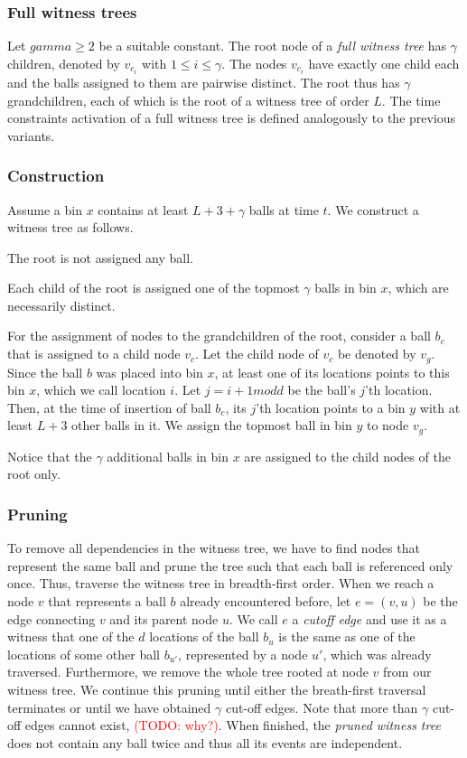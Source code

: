 \documentclass[a4paper,12pt]{article}
\newcommand\todo[1]{\textcolor{red}{(TODO: #1)}}
\begin{document}
\subsubsection{Full witness trees}
\label{sec:analysis:FullWT}
Let $gamma \geq 2$ be a suitable constant. The root node of a \emph{full witness tree} has $\gamma$ children, denoted by $v_{c_i}$ with $1\leq i \leq \gamma$. The nodes $v_{c_i}$ have exactly one child each and the balls assigned to them are pairwise distinct. The root thus has $\gamma$ grandchildren, each of which is the root of a witness tree of order $L$. The time constraints activation of a full witness tree is defined analogously to the previous variants.

\subsubsection{Construction}
\label{sec:analysis:constructionFullWT}
Assume a bin $x$ contains at least $L+3+\gamma$ balls at time $t$. We construct a witness tree as follows.
\begin{compactitem}
\item The root is not assigned any ball.
\item Each child of the root is assigned one of the topmost $\gamma$ balls in bin $x$, which are necessarily distinct.
\item For the assignment of nodes to the grandchildren of the root, consider a ball $b_c$ that is assigned to a child node $v_c$. Let the child node of $v_c$ be denoted by $v_g$. Since the ball $b$ was placed into bin $x$, at least one of its locations points to this bin $x$, which we call location $i$. Let $j = i+1 mod d$ be the ball's $j$'th location. Then, at the time of insertion of ball $b_c$, its $j$'th location points to a bin $y$ with at least $L+3$ other balls in it. We assign the topmost ball in bin $y$ to node $v_g$.
\end{compactitem}
Notice that the $\gamma$ additional balls in bin $x$ are assigned to the child nodes of the root only. 

\subsubsection{Pruning}
\label{sec:analysis:pruningFullWT}
To remove all dependencies in the witness tree, we have to find nodes that represent the same ball and prune the tree such that each ball is referenced only once. Thus, traverse the witness tree in breadth-first order. When we reach a node $v$ that represents a ball $b$ already encountered before, let $e = (v,u)$ be the edge connecting $v$ and its parent node $u$. We call $e$ a \emph{cutoff edge} and use it as a witness that one of the $d$ locations of the ball $b_u$ is the same as one of the locations of some other ball $b_{u'}$, represented by a node $u'$, which was already traversed. Furthermore, we remove the whole tree rooted at node $v$ from our witness tree. We continue this pruning until either the breath-first traversal terminates or until we have obtained $\gamma$ cut-off edges. Note that more than $\gamma$ cut-off edges cannot exist, \todo{why?}. When finished, the \emph{pruned witness tree} does not contain any ball twice and thus all its events are independent. 
\end{document}
